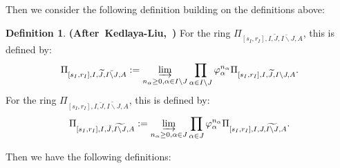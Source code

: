 \documentclass[12pt]{amsart}
\theoremstyle{definition}
\newtheorem{definition}[theorem]{Definition}
\numberwithin{equation}{section}
\begin{document}
\indent Then we consider the following definition building on the definitions above:


\begin{definition}\mbox{\bf{(After Kedlaya-Liu, \cite[Definition 5.2.1]{KL2})}}
For the ring $\Pi_{[s_I,r_I],I,\widetilde{J},\breve{I\backslash J},A}$, this is defined by:
\begin{align}
\Pi_{[s_I,r_I],I,\widetilde{J},\breve{I\backslash J},A}:=\varinjlim_{n_\alpha\geq 0,\alpha  \in I\backslash J}\prod_{\alpha\in I\backslash J}\varphi_\alpha^{n_\alpha}\Pi_{[s_I,r_I],I,\widetilde{J},I\backslash J,A}.
\end{align}
For the ring $\Pi_{[s_I,r_I],I,\breve{J},\widetilde{I\backslash J},A}$, this is defined by:
\begin{align}
\Pi_{[s_I,r_I],I,\breve{J},\widetilde{I\backslash J},A}:=\varinjlim_{n_\alpha\geq 0,\alpha  \in J}\prod_{\alpha\in J}\varphi_\alpha^{n_\alpha}\Pi_{[s_I,r_I],I,{J},\widetilde{I\backslash J},A}.
\end{align}

  
\end{definition}





\indent Then we have the following definitions:
\end{document}
